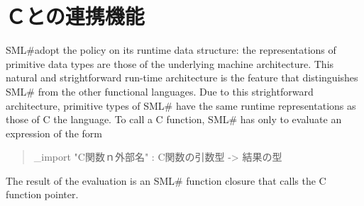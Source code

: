 \documentclass{jbook}
\newif\ifjp
\newcommand{\txt}[2]{#1}
\newcommand{\smlsharp}{SML\#}
\newenvironment{program}{\begin{quote}\begin{tt}}%
                        {\end{tt}\end{quote}}
\begin{document}
\section{\txt{Ｃとの連携機能}{Direct interface to C}}
\ifjp%
	\smlsharp{}は，その実行時の原始データ型の表現は，計算機アーキテ
クチャが提供する表現を採用している．
	この当たり前の実行時アーキテクチャは，既存の関数型言語にはない
\smlsharp{}の際立った特長である．
	これにより，\smlsharp{}の原始データ型はC言語の原始データ型の同一
の表現であり，広範囲のC言語関数を直接呼び出すことができる．
	C言語の関数を呼び出すには，\smlsharp{}プログラムから
以下の式を評価すればよい．
\begin{program}
\_import "C関数ｎ外部名" : C関数の引数型 -> 結果の型
\end{program}
	この評価結果は，C言語の関数ポインタを呼び出すシーケンスを実行す
る\smlsharp{}の関数閉包である．
\else%
	\smlsharp{}adopt the policy on its runtime data
structure: the representations of primitive data types are those of the
underlying machine architecture.
	This natural and strightforward run-time architecture is the
feature that distinguishes \smlsharp{} from the other functional
languages.
	Due to this strightforward architecture, primitive types of
\smlsharp{} have the same runtime representations as those of C
the language.
	To call a C function, \smlsharp{} has only to evaluate an
expression of the form
\begin{program}
\_import "C関数ｎ外部名" : C関数の引数型 -> 結果の型
\end{program}
	The result of the evaluation is an \smlsharp{} function closure
that calls the C function pointer.
\fi%
\end{document}
